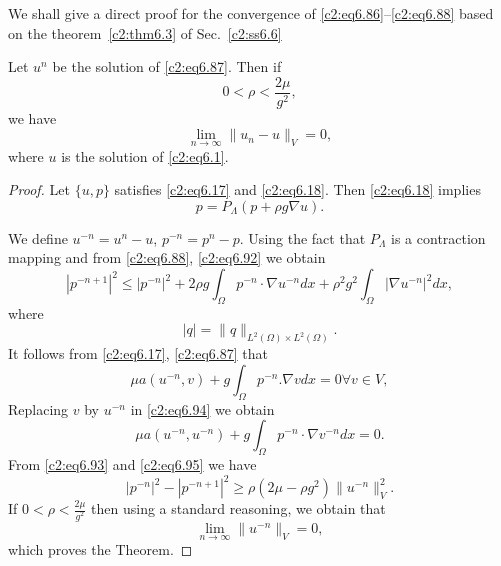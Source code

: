 We shall give a direct proof for the convergence of \eqref{c2:eq6.86}--\eqref{c2:eq6.88}
based on the theorem~\ref{c2:thm6.3} of Sec.~\ref{c2:ss6.6}  

\begin{theorem}\label{c2:thm6.9}%
Let $u^n$ be the solution of \eqref{c2:eq6.87}. Then if  
\begin{equation}
0 < \rho < \frac{2 \mu }{g^2}, \tag{6.90}\label{c2:eq6.90} 
\end{equation}
we have 
\begin{equation}
\lim_{n \to \infty} \parallel  u_n - u\parallel_V = 0, \tag{6.91}\label{c2:eq6.91} 
\end{equation}\pageoriginale 
where $u$ is the solution of \eqref{c2:eq6.1}.
\end{theorem}

\begin{proof}
Let $\{u, p\}$ satisfies \eqref{c2:eq6.17} and \eqref{c2:eq6.18}. Then
\eqref{c2:eq6.18} implies  
\begin{equation}
p = P_\Lambda  (p + \rho g \nabla u).\tag{6.92}\label{c2:eq6.92}
\end{equation}

We define $u^{-n} = u^n -u$, $p^{-n} = p^n -p$. Using the fact that
$P_\Lambda $ is a contraction mapping and from \eqref{c2:eq6.88},
\eqref{c2:eq6.92} we obtain  
\begin{equation}
|p^{-n+1}|^2 \leq |p^{-n}|^2 + 2 \rho g \int_\Omega p^{-n}\cdot
\nabla u^{-n} dx + \rho^2 g^2 \int_\Omega |\nabla
u^{-n}|^2 dx, \tag{6.93}\label{c2:eq6.93} 
\end{equation}
where 
$$
|q| = \parallel  q \parallel  _{L^2 (\Omega) \times L^2 (\Omega)}.
$$
It follows from \eqref{c2:eq6.17}, \eqref{c2:eq6.87} that 
\begin{equation}
\mu a (u^{-n}, v) + g \int_\Omega p^{-n}. \nabla v dx = 0
\forall v \in V, \tag{6.94}\label{c2:eq6.94} 
\end{equation}
Replacing $v$ by $u^{-n}$ in \eqref{c2:eq6.94} we obtain  
\begin{equation}
\mu a (u^{-n}, u^{-n})+g \int_\Omega p^{-n}\cdot \nabla v^{-n}
dx = 0. \tag{6.95}\label{c2:eq6.95} 
\end{equation}
From \eqref{c2:eq6.93} and \eqref{c2:eq6.95} we have  
\begin{equation}
|p^{-n}|^2 - |p^{-n +1}|^2 \geq \rho (2 \mu - \rho g^2 ) \parallel 
u^{-n}\parallel^2_V. \tag{6.96}\label{c2:eq6.96}  
\end{equation}
If $0 < \rho < \frac{2\mu}{g^2}$ then using a standard reasoning, we
obtain that  
$$
\lim_{n \to \infty} \parallel u^{-n}\parallel_V = 0, 
$$
which proves the Theorem.
\end{proof}

